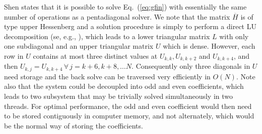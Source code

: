 \documentclass[11pt, oneside]{article}
\newcommand{\D}[1]{\overline{#1}}
\begin{document}
Shen \cite{shen1995} states that it is possible to solve Eq.~(\ref{eq:gfin}) 
with 
essentially the same number of operations as a pentadiagonal solver. We note 
that the matrix 
$\D{H}$ is of type upper Hessenberg and a solution
procedure is simply to perform a direct LU decomposition (se, e.g., 
\cite{stewart98}), which leads to a 
lower triangular  
matrix $L$ with only one subdiagonal and an upper triangular matrix $U$ which 
is dense. However, each row in $U$ 
contains at most three distinct values at $U_{k,k}, U_{k,k+2}$ and $U_{k,k+4}$, 
and then $U_{k,j} = U_{k,k+4}\, \forall \, j = k+6, k+8, \ldots N$. 
Consequently 
only three diagonals in $U$ need storage and the back solve can be traversed 
very efficiently in $O(N)$. Note also that the system could be decoupled into 
odd and even coefficients, which leads to two subsystem that may be trivially 
solved 
simultaneously in two threads. For optimal 
performance, the odd and even coefficient would then need to be stored 
contiguously in computer memory, and not alternately, which would be the normal 
way of storing the coefficients.


\end{document}
